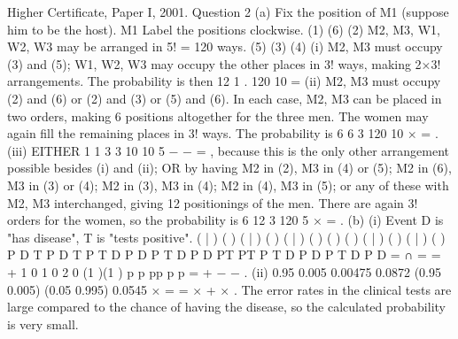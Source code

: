 \documentclass[a4paper,12pt]{article}
\begin{document}
Higher Certificate, Paper I, 2001. Question 2
(a) Fix the position of M1 (suppose him to be the host).
M1 Label the positions clockwise.
(1)
(6) (2) M2, M3, W1, W2, W3 may be arranged in 5! =
120 ways.
(5) (3)
(4)
(i) M2, M3 must occupy (3) and (5); W1, W2, W3 may occupy the other
places in 3! ways, making 2×3! arrangements. The probability is then
12 1 .
120 10
=
(ii) M2, M3 must occupy (2) and (6) or (2) and (3) or (5) and (6). In each
case, M2, M3 can be placed in two orders, making 6 positions altogether for
the three men. The women may again fill the remaining places in 3! ways.
The probability is 6 6 3
120 10
× = .
(iii) EITHER 1 1 3 3
10 10 5
− − = , because this is the only other arrangement
possible besides (i) and (ii);
OR by having M2 in (2), M3 in (4) or (5); M2 in (6), M3 in (3) or (4); M2 in
(3), M3 in (4); M2 in (4), M3 in (5); or any of these with M2, M3 interchanged,
giving 12 positionings of the men. There are again 3! orders for the women,
so the probability is 6 12 3
120 5
× = .
(b) (i) Event D is "has disease", T is "tests positive".
( | ) ( ) ( | ) ( ) ( | ) ( )
( ) ( ) ( | ) ( ) ( | ) ( )
P D T P D T P T D P D P T D P D
PT PT P T D P D P T D P D
= ∩ = =
+
1 0
1 0 2 0 (1 )(1 )
p p
pp p p
=
+ − −
.
(ii) 0.95 0.005 0.00475 0.0872
(0.95 0.005) (0.05 0.995) 0.0545
× = =
× + ×
.
The error rates in the clinical tests are large compared to the chance of having
the disease, so the calculated probability is very small.
\end{document}
